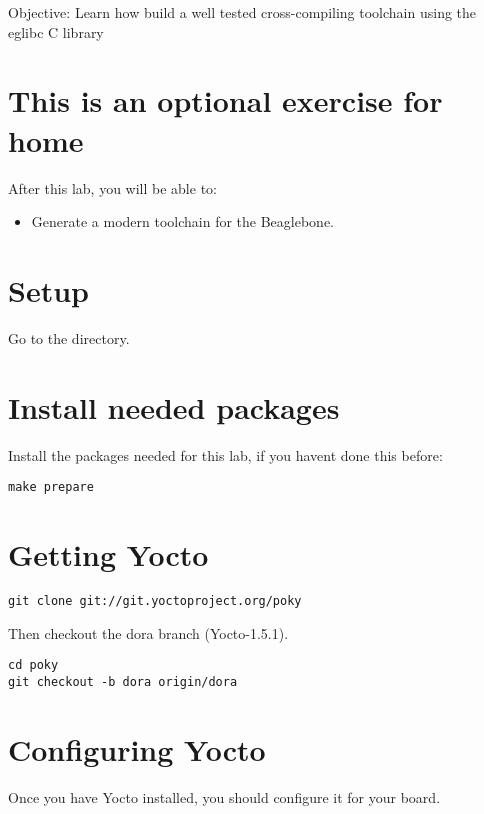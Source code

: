   {Objective: Learn how build a well tested cross-compiling toolchain using the eglibc C
  library}

\section{This is an optional exercise for home}

After this lab, you will be able to:

\begin{itemize}
\item Generate a modern toolchain for the Beaglebone.
\end{itemize}

\section{Setup}

Go to the \labdir directory.

\section{Install needed packages}

Install the packages needed for this lab, if you havent done this before:

\begin{verbatim}
make prepare
\end{verbatim}

\section{Getting Yocto}

\begin{verbatim}
git clone git://git.yoctoproject.org/poky
\end{verbatim}

Then checkout the dora branch (Yocto-1.5.1).

\begin{verbatim}
cd poky
git checkout -b dora origin/dora
\end{verbatim}

\clearpage
\section{Configuring Yocto}

Once you have Yocto installed, you should configure it for your board.

